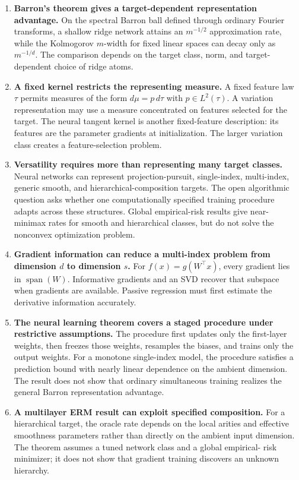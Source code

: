 \documentclass[11pt,twoside]{article}
\theoremstyle{definition}
\theoremstyle{remark}
\begin{document}
\begin{enumerate}[leftmargin=*]
\item \textbf{Barron's theorem gives a target-dependent representation
advantage.} On the spectral Barron ball defined through ordinary Fourier
transforms, a shallow ridge network attains an \(m^{-1/2}\) approximation rate,
while the Kolmogorov \(m\)-width for fixed linear spaces can decay only as
\(m^{-1/d}\). The comparison depends on the target class, norm, and
target-dependent choice of ridge atoms.

\item \textbf{A fixed kernel restricts the representing measure.} A fixed
feature law \(\tau\) permits measures of the form \(d\mu=p\,d\tau\) with
\(p\in L^2(\tau)\). A variation representation may use a measure concentrated
on features selected for the target. The neural tangent kernel is another
fixed-feature description: its features are the parameter gradients at
initialization. The larger variation class creates a feature-selection
problem.

\item \textbf{Versatility requires more than representing many target
classes.} Neural networks can represent projection-pursuit, single-index,
multi-index, generic smooth, and hierarchical-composition targets. The open
algorithmic question asks whether one computationally specified training
procedure adapts across these structures. Global empirical-risk results give
near-minimax rates for smooth and hierarchical classes, but do not solve the
nonconvex optimization problem.

\item \textbf{Gradient information can reduce a multi-index problem from
dimension \(d\) to dimension \(s\).} For
\(f(x)=g(W^\top x)\), every gradient lies in
\(\operatorname{span}(W)\). Informative gradients and an SVD recover that
subspace when gradients are available. Passive regression must first estimate
the derivative information accurately.

\item \textbf{The neural learning theorem covers a staged procedure under
restrictive assumptions.} The procedure first updates only the first-layer
weights, then freezes those weights, resamples the biases, and trains only the
output weights. For a monotone single-index model, the procedure satisfies a
prediction bound with nearly linear dependence on the ambient dimension. The
result does not show that ordinary simultaneous training realizes the general
Barron representation advantage.

\item \textbf{A multilayer ERM result can exploit specified composition.}
For a hierarchical target, the oracle rate depends on the local arities and
effective smoothness parameters rather than directly on the ambient input
dimension. The theorem assumes a tuned network class and a global empirical-
risk minimizer; it does not show that gradient training discovers an unknown
hierarchy.
\end{enumerate}
\printendnotes
\end{document}
